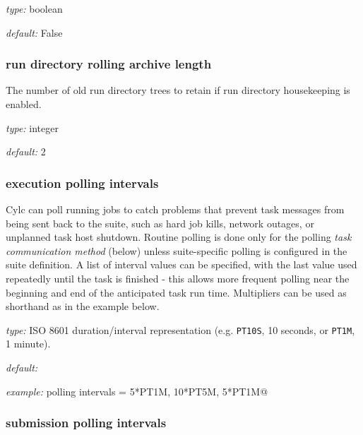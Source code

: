 \begin{myitemize}
\item {\em type:} boolean
\item {\em default:} False
\end{myitemize}

\subsubsection{run directory rolling archive length}

The number of old run directory trees to retain if run directory
housekeeping is enabled.
\begin{myitemize}
\item {\em type:} integer
\item {\em default:} 2
\end{myitemize}

\subsubsection{execution polling intervals}
\label{execution_polling}

Cylc can poll running jobs to catch problems that prevent task messages
from being sent back to the suite, such as hard job kills, network
outages, or unplanned task host shutdown. Routine polling is done only
for the polling {\em task communication method} (below) unless
suite-specific polling is configured in the suite definition.
A list of interval values can be specified, with the last value used
repeatedly until the task is finished - this allows more frequent
polling near the beginning and end of the anticipated task run time.
Multipliers can be used as shorthand as in the example below.

\begin{myitemize}
\item {\em type:} ISO 8601 duration/interval representation (e.g.
\lstinline=PT10S=, 10 seconds, or \lstinline=PT1M=, 1 minute).
\item {\em default:}
\item {\em example:} \lstinline@execution polling intervals = 5*PT1M, 10*PT5M, 5*PT1M@
\end{myitemize}


\subsubsection{submission polling intervals}
\label{submission_polling}

